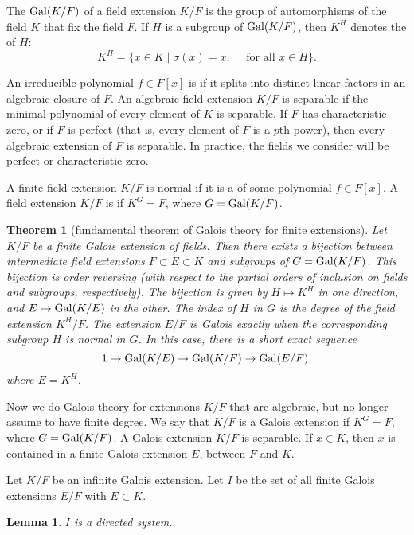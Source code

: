 \documentclass{amsart}
\newtheorem{theorem}[equation]{Theorem}
\newtheorem{lemma}[equation]{Lemma}
\def\oG{\op{Gal}}
\begin{document}
The  $\oG(K/F)$
of a field extension $K/F$ is the group of automorphisms
of the field $K$ that fix the field $F$.   If $H$ is a subgroup of
$\oG(K/F)$, then $K^H$ denotes the  of $H$:
\[
K^H= \{x \in K \mid \sigma(x) = x,\quad \text{ for all } x\in H\}.
\]


An irreducible polynomial $f\in F[x]$ is  if it splits
into distinct linear factors in an algebraic closure of $F$.
An algebraic field extension $K/F$ is separable if the minimal polynomial
of every element of $K$ is separable.  If $F$ has characteristic zero, or
if $F$ is perfect (that is, every element of $F$ is a $p$th power), then
every algebraic extension of $F$ is separable.  In practice, the fields
we consider will be perfect or characteristic zero.

A finite field extension $K/F$ is normal if it is a  of
some polynomial $f\in F[x]$.
A field extension $K/F$ is  if $K^G = F$, where $G=\oG(K/F)$.

\begin{theorem}[fundamental theorem of Galois theory for finite extensions]  
Let $K/F$ be a finite Galois extension of fields.
Then there exists a bijection between intermediate field extensions
$F\subset E\subset K$ and subgroups of $G=\oG(K/F)$.  This bijection
is order reversing (with respect to the partial orders of inclusion
on fields and subgroups, respectively).  The bijection is given by
$H\mapsto K^H$ in one direction, and $E\mapsto \oG(K/E)$ in the
other.   The index of $H$ in $G$ is the degree of the field extension $K^H/F$.
The extension $E/F$ is Galois exactly when the corresponding
subgroup $H$ is normal in $G$.  In this case, there is a short exact sequence
\[
1 \to \oG(K/E) \to \oG(K/F) \to \oG(E/F),
\]
where $E=K^H$.
\end{theorem}

Now we do Galois theory for extensions $K/F$ that are algebraic, but no longer
assume to have finite degree.  We say that $K/F$ is a Galois extension if
$K^G = F$, where $G=\oG(K/F)$.  A Galois extension $K/F$ is separable.
If $x\in K$, then $x$ is contained in a finite Galois extension $E$, between $F$ and $K$.

Let $K/F$ be an infinite Galois extension.  Let $I$ be the set of all finite
Galois extensions $E/F$ with $E\subset K$.

\begin{lemma} $I$ is a directed system.  
\end{lemma}
\end{document}
